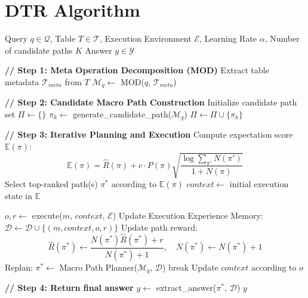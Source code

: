 \appendix
\section{DTR Algorithm}
\begin{algorithm}[ht!]
\caption{Deep Tabular Research}
\label{alg:dtr-framework}
\begin{algorithmic}[1]
\Require Query $q \in \mathcal{Q}$, Table $T \in \mathcal{T}$, Execution Environment $\mathcal{E}$, Learning Rate $\alpha$, Number of candidate paths $K$
\Ensure Answer $y \in \mathcal{Y}$

\State \textbf{// Step 1: Meta Operation Decomposition (MOD)}
\State Extract table metadata $\mathcal{T}_{meta}$ from $T$
\State $\mathcal{M}_q \gets$ MOD($q$, $\mathcal{T}_{meta}$) 

\State \textbf{// Step 2: Candidate Macro Path Construction}
\State Initialize candidate path set $\Pi \gets \{\}$ 
    \State $\pi_k \gets$ generate\_candidate\_path($\mathcal{M}_q$) 
    \State $\Pi \gets \Pi \cup \{\pi_k\}$
\EndFor

\State \textbf{// Step 3: Iterative Planning and Execution}
        \State Compute expectation score $\mathbb{E}(\pi)$: 
        \[
        \mathbb{E}(\pi) = \hat{R}(\pi) + c \cdot P(\pi) \sqrt{\frac{\log \sum_{\pi'} N(\pi')}{1 + N(\pi)}}
        \]
    \EndFor
    \State Select top-ranked path(s) $\pi^*$ according to $\mathbb{E}(\pi)$
    \State $context \gets$ initial execution state in $\mathbb{E}$
    
        \State $o, r \gets$ execute($m$, $context$, $\mathcal{E}$) 
        \State Update Execution Experience Memory: $\mathcal{D} \gets \mathcal{D} \cup \{(m, context, o, r)\}$
        \State Update path reward:
        \[
        \hat{R}(\pi^*) \gets \frac{N(\pi^*) \hat{R}(\pi^*) + r}{N(\pi^*) + 1}, \quad N(\pi^*) \gets N(\pi^*) + 1
        \]
            \State Replan: $\pi^* \gets$ Macro Path Planner($\mathcal{M}_q$, $\mathcal{D}$)
            \State break 
        \EndIf
        \State Update $context$ according to $o$
    \EndFor
\EndWhile

\State \textbf{// Step 4: Return final answer}
\State $y \gets$ extract\_answer($\pi^*$, $\mathcal{D}$)
\State \Return $y$
\end{algorithmic}
\end{algorithm}


